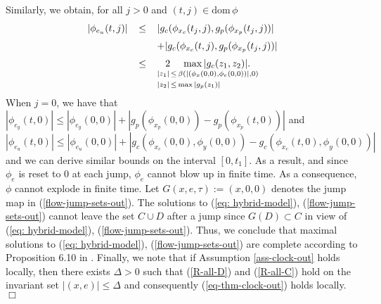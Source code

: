 \documentclass[a4paper, 9pt, twocolumn]{IEEEtran}
\theoremstyle{plain}
\theoremstyle{definition}
\newcommand{\dom}{\ensuremath{\text{dom}\,}}
\begin{document}
Similarly, we obtain, for all $j > 0$ and $(t,j) \in \dom \phi$
\begin{equation}\label{eu-bound}
\begin{array}{lcl}
  |\phi_{e_{u}}(t,j)| &\leq& |g_{c}(\phi_{x_{c}}(t_{j},j), g_{p}(\phi_{x_{p}}(t_{j},j))| \\[6pt]
                      &\quad& + |g_{c}(\phi_{x_{c}}(t,j), g_{p}(\phi_{x_{p}}(t_{j},j))| \\[6pt]
                      &\leq& \underset{\begin{subarray}{l}|z_{1}|\,\leq \,\beta(|(\phi_{x}(0,0), \phi_{e}(0,0))|, 0)\\[3pt]
                                                         |z_{2}|\,\leq \,\max|g_{p}(z_{1})|\end{subarray}}{2\hspace{12pt}\max|g_{c}(z_{1},z_{2})|.}
\end{array}
\end{equation}
When $j = 0$, we have that $|\phi_{e_{y}}(t,0)| \leq |\phi_{e_{y}}(0,0)| + |g_{p}(\phi_{x_{p}}(0,0)) - g_{p}(\phi_{x_{p}}(t,0))|$ and $|\phi_{e_{u}}(t,0)| \leq |\phi_{e_{u}}(0,0)| + |g_{c}(\phi_{x_{c}}(0,0), \phi_{y}(0,0)) - g_{c}(\phi_{x_{c}}(t,0), \phi_{y}(0,0))|$ and we can derive similar bounds on the interval $[0,t_{1}]$. As a result, and since $\phi_{e}$ is reset to 0 at each jump, $\phi_{e}$ cannot blow up in finite time. As a consequence, $\phi$ cannot explode in finite time. Let $G(x,e,\tau) := (x,0,0)$ denotes the jump map in (\ref{flow-jump-sets-out}). The solutions to (\ref{eq: hybrid-model}), (\ref{flow-jump-sets-out}) cannot leave the set $C\cup D$ after a jump since $G(D) \subset C$ in view of (\ref{eq: hybrid-model}), (\ref{flow-jump-sets-out}). Thus, we conclude that maximal solutions to (\ref{eq: hybrid-model}), (\ref{flow-jump-sets-out}) are complete according to Proposition 6.10 in \cite{Teel}. Finally, we note that if Assumption \ref{ass-clock-out} holds locally, then there exists $\Delta>0$ such that (\ref{R-all-D}) and (\ref{R-all-C}) hold on the invariant set $|(x,e)|\leq \Delta$ and consequently (\ref{eq-thm-clock-out}) holds locally.  \hfill $\Box$
\end{document}
